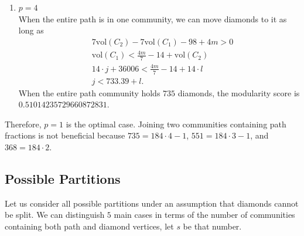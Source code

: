 \documentclass[letterpaper,12pt]{article}
\begin{document}
\begin{enumerate}
      \item $p = 4$\\
            When the entire path is in one community, we can move diamonds to it as long as
            \begin{align*}
                   & 7\text{vol}(C_2) - 7\text{vol}(C_1) - 98 + 4m > 0     \\
                   & \text{vol}(C_1) < \frac{4m}{7} - 14 + \text{vol}(C_2) \\
                   & 14 \cdot j + 36006 < \frac{4m}{7} - 14 + 14 \cdot l   \\
                   & j < 733.39 + l.
            \end{align*}
            When the entire path community holds $735$ diamonds, the modularity score is $0.51014235729660872831$.
\end{enumerate}

Therefore, $p = 1$ is the optimal case. Joining two communities containing path fractions is not beneficial because $735 = 184\cdot 4 - 1$, $551 = 184 \cdot 3 - 1$, and $368 = 184 \cdot 2$.


\subsection{Possible Partitions}
Let us consider all possible partitions under an assumption that diamonds cannot be split. We can distinguish $5$ main cases in terms of the number of communities containing both path and diamond vertices, let $s$ be that number.
\end{document}

